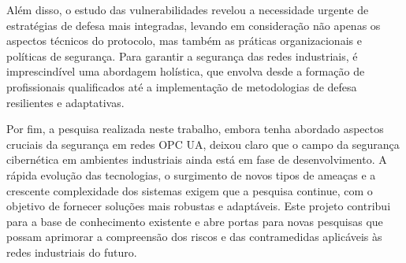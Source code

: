     Além disso, o estudo das vulnerabilidades revelou a necessidade urgente de estratégias de defesa mais integradas, levando em consideração não apenas os aspectos técnicos do protocolo, mas também as práticas organizacionais e políticas de segurança. Para garantir a segurança das redes industriais, é imprescindível uma abordagem holística, que envolva desde a formação de profissionais qualificados até a implementação de metodologias de defesa resilientes e adaptativas.

    Por fim, a pesquisa realizada neste trabalho, embora tenha abordado aspectos cruciais da segurança em redes OPC UA, deixou claro que o campo da segurança cibernética em ambientes industriais ainda está em fase de desenvolvimento. A rápida evolução das tecnologias, o surgimento de novos tipos de ameaças e a crescente complexidade dos sistemas exigem que a pesquisa continue, com o objetivo de fornecer soluções mais robustas e adaptáveis. Este projeto contribui para a base de conhecimento existente e abre portas para novas pesquisas que possam aprimorar a compreensão dos riscos e das contramedidas aplicáveis às redes industriais do futuro.

